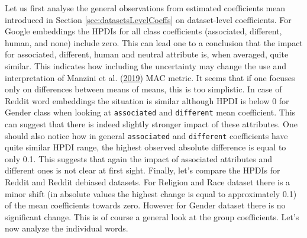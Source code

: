 \documentclass[12pt,]{book}
\begin{document}
\begin{table}

\caption{\label{tab:dTabRD}Overview statistics  (Reddit embedding, debiased)}
\centering
{}
\end{table}

\normalsize

Let us first analyse the general observations from estimated
coefficients mean introduced in Section \ref{sec:datasetsLevelCoeffs} on
dataset-level coefficients. For Google embeddings the HPDIs for all
class coefficients (associated, different, human, and none) include
zero. This can lead one to a conclusion that the impact for associated,
different, human and neutral attribute is, when averaged, quite similar.
This indicates how including the uncertainty may change the use and
interpretation of Manzini et al.
(\protect\hyperlink{ref-Manzini2019blackToCriminal}{2019}) MAC metric.
It seems that if one focuses only on differences between means of means,
this is too simplistic. In case of Reddit word embeddings the situation
is similar although HPDI is below 0 for Gender class when looking at
\texttt{associated} and \texttt{different} mean coefficient. This can
suggest that there is indeed slightly stronger impact of these
attributes. One should also notice how in general \texttt{associated}
and \texttt{different} coefficients have quite similar HPDI range, the
highest observed absolute difference is equal to only 0.1. This suggests
that again the impact of associated attributes and different ones is not
clear at first sight. Finally, let's compare the HPDIs for Reddit and
Reddit debiased datasets. For Religion and Race dataset there is a minor
shift (in absolute values the highest change is equal to approximately
0.1) of the mean coefficients towards zero. However for Gender dataset
there is no significant change. This is of course a general look at the
group coefficients. Let's now analyze the individual words.
\end{document}
